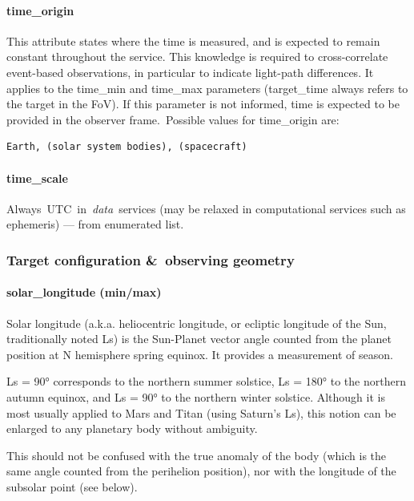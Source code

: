 \documentclass[11pt,a4paper]{ivoa}
\begin{document}
\paragraph{time\_origin}

This attribute states where the time is measured, and is expected to remain constant throughout the service. This knowledge is required to cross-correlate event-based observations, in particular to indicate light-path differences. It applies to the time\_min and time\_max parameters (target\_time always refers to the target in the FoV). If this parameter is not informed, time is expected to be provided in the observer frame. Possible values for time\_origin are:






\begin{verbatim}Earth, (solar system bodies), (spacecraft)\end{verbatim}




\paragraph{time\_scale}

Always UTC in \emph{data} services (may be relaxed in computational services such as ephemeris) — from enumerated list.

\subsubsection{Target configuration \& observing geometry}

\paragraph{solar\_longitude (min/max)}

Solar longitude (a.k.a. heliocentric longitude, or ecliptic longitude of the Sun, traditionally noted Ls) is the Sun-Planet vector angle counted from the planet position at N hemisphere spring equinox. It provides a measurement of season.

Ls = 90° corresponds to the northern summer solstice, Ls = 180° to the northern autumn equinox, and Ls = 90° to the northern winter solstice. Although it is most usually applied to Mars and Titan (using Saturn's Ls), this notion can be enlarged to any planetary body without ambiguity.

This should not be confused with the true anomaly of the body (which is the same angle counted from the perihelion position), nor with the longitude of the subsolar point (see below).
\end{document}
